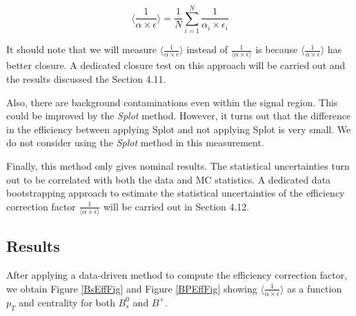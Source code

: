 \begin{equation}
\langle\frac{1}{\alpha \times \epsilon} \rangle = \frac{1}{N} \sum_{i = 1}^{N} \frac{1}{\alpha_i \times \epsilon_i}
\end{equation}

It should note that we will measure  $\langle\frac{1}{\alpha \times \epsilon} \rangle$ instead of $\frac{1}{\langle\alpha \times \epsilon \rangle}$ is because $\langle\frac{1}{\alpha \times \epsilon} \rangle$ has better closure. A dedicated closure test on this approach will be carried out and the results discussed the Section 4.11. 

Also, there are background contaminations even within the signal region. This could be improved by the \textit{Splot} method. However, it turns out that the difference in the efficiency between applying Splot and not applying Splot is very small. We do not consider using the \textit{Splot} method in this measurement. 

Finally, this method only gives nominal results. The statistical uncertainties turn out to be correlated with both the data and MC statistics. A dedicated data bootstrapping approach to estimate the statistical uncertainties of the efficiency correction factor $\frac{1}{\langle\alpha \times \epsilon \rangle}$ will be carried out in Section 4.12.

\subsection{Results}

After applying a data-driven method to compute the efficiency correction factor, we obtain Figure \ref{BsEffFig} and Figure \ref{BPEffFig} showing $\langle\frac{1}{\alpha \times \epsilon} \rangle$ as a function $p_T$ and centrality for both $B_s^0$ and $B^+$.


